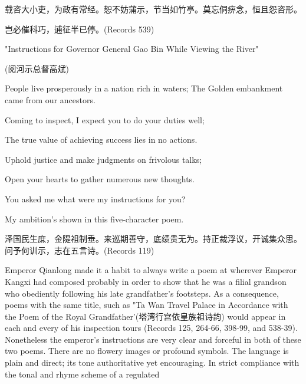 \begin{BookQuote}
载咨大小吏，为政有常经。恕不妨蒲示，节当如竹亭。莫忘侗痹念，恒且怨咨形。
\end{BookQuote}

\begin{BookQuote}
岂必催科巧，逋征半已停。(Records 539)
\end{BookQuote}

\begin{BookQuote}
"Instructions for Governor General Gao Bin While Viewing the River"
\end{BookQuote}

(阅河示总督高斌)

\begin{BookQuote}
People live prosperously in a nation rich in waters; The Golden embankment came from our ancestors.
\end{BookQuote}

\begin{BookQuote}
Coming to inspect, I expect you to do your duties well;
\end{BookQuote}

\begin{BookQuote}
The true value of achieving success lies in no actions.
\end{BookQuote}

\begin{BookQuote}
Uphold justice and make judgments on frivolous talks;
\end{BookQuote}

\begin{BookQuote}
Open your hearts to gather numerous new thoughts.
\end{BookQuote}

\begin{BookQuote}
You asked me what were my instructions for you?
\end{BookQuote}

\begin{BookQuote}
My ambition's shown in this five-character poem.
\end{BookQuote}

\begin{BookQuote}
泽国民生庶，金隄祖制垂。来巡期善守，底绩贵无为。持正裁浮议，开诚集众思。问予何训示，志在五言诗。(Records 119)
\end{BookQuote}

Emperor Qianlong made it a habit to always write a poem at wherever Emperor Kangxi had composed probably in order to show that he was a filial grandson who obediently following his late grandfather's footsteps. As a consequence, poems with the same title, such as "Ta Wan Travel Palace in Accordance with the Poem of the Royal Grandfather'(塔湾行宫依皇族祖诗韵) would appear in each and every of his inspection tours (Records 125, 264-66, 398-99, and 538-39). Nonetheless the emperor's instructions are very clear and forceful in both of these two poems. There are no flowery images or profound symbols. The language is plain and direct; its tone authoritative yet encouraging. In strict compliance with the tonal and rhyme scheme of a regulated


